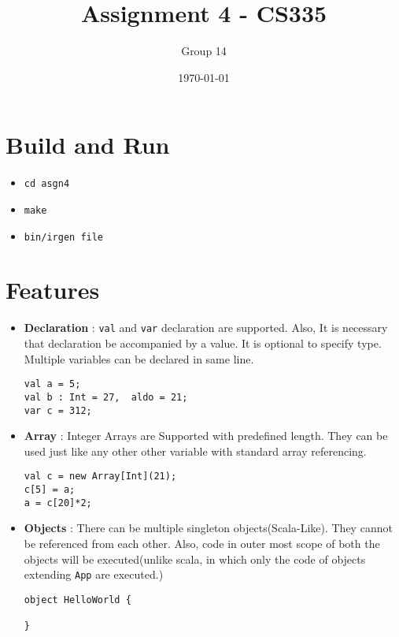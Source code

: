 \documentclass[11pt]{article}
\author{Group 14}
\date{\today}
\title{Assignment 4 - CS335}
\begin{document}
\maketitle


\section{Build and Run}
\label{sec:orgheadline1}

\begin{itemize}
\item \texttt{cd asgn4}
\item \texttt{make}
\item \texttt{bin/irgen file}
\end{itemize}

\section{Features}
\label{sec:orgheadline2}

\begin{itemize}
\item \textbf{Declaration} : \texttt{val} and \texttt{var} declaration are supported. Also, It is necessary that declaration be accompanied by a value. It is optional to specify type. Multiple variables can be declared in same line.
\begin{verbatim}
val a = 5;
val b : Int = 27,  aldo = 21;
var c = 312;
\end{verbatim}

\item \textbf{Array} : Integer Arrays are Supported with predefined length. They can be used just like any other other variable with standard array referencing. 

\begin{verbatim}
val c = new Array[Int](21);
c[5] = a;
a = c[20]*2;
\end{verbatim}

\item \textbf{Objects} : There can be multiple singleton objects(Scala-Like). They cannot be referenced from each other. Also, code in outer most scope of both the objects will be executed(unlike scala, in which only the code of objects extending \texttt{App} are executed.)

\begin{verbatim}
object HelloWorld {

}
\end{verbatim}
\end{itemize}
\end{document}
